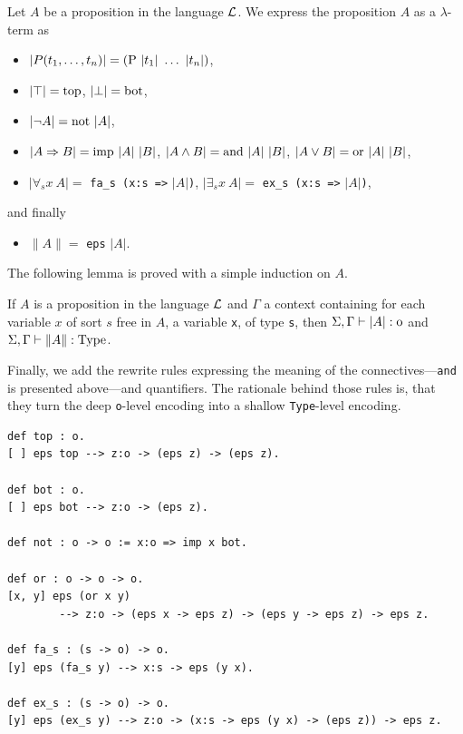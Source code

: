 \documentclass[english]{lipics}
\newcommand\fa{\forall}
\newcommand\ex{\exists}
\newcommand\lst[1]{{\rm \lstinline{#1}}}
\begin{document}
\begin{definition}
Let $A$ be a proposition in the language ${\cal L}$.
We express the proposition $A$ as a $\lambda$-term as
\begin{itemize}
\item $|P(t_1,\ldots,t_n)| = (\mbox{\lst{P}}~|t_1|~\ldots~|t_n|)$,
\item $|\top| = \mbox{\lst{top}}$, $|\bot| = \mbox{\lst{bot}}$,
\item $|\neg A| = \mbox{\lst{not}}~|A|$,
\item $|A \Rightarrow B| = \mbox{\lst{imp}}~|A|~|B|$,
$|A \wedge B| = \mbox{\lst{and}}~|A|~|B|$,
$|A \vee B| = \mbox{\lst{or}}~|A|~|B|$,
\item
$|\fa_s x~A| = $ \lst{fa_s (x:s =>} $|A|$\lst{)},
$|\ex_s x~A| = $ \lst{ex_s (x:s =>} $|A|$\lst{)},
\end{itemize}
and finally
\begin{itemize}
\item $\|A\| = $ \lst{eps} $|A|$.
\end{itemize}
\end{definition}

The following lemma is proved with a simple induction on $A$.
\begin{lemma}
If $A$ is a proposition in the language ${\cal L}$ and
$\Gamma$ a context containing for each variable $x$ of sort
$s$ free in $A$, a variable \lst{x}, of type \lst{s}, then
$\Sigma, \Gamma \vdash |A|:\mbox{\lst{o}}$
and
$\Sigma, \Gamma \vdash \|A\|:\mbox{\lst{Type}}$.
\end{lemma}

Finally, we add the rewrite rules expressing the meaning of the
connectives---\lst{and} is presented above---and quantifiers. The
rationale behind those rules is, that they turn the deep
\lst{o}-level encoding into a shallow \lst{Type}-level encoding.


\begin{lstlisting}
def top : o.
[ ] eps top --> z:o -> (eps z) -> (eps z).

def bot : o.
[ ] eps bot --> z:o -> (eps z).

def not : o -> o := x:o => imp x bot.

def or : o -> o -> o.
[x, y] eps (or x y)
        --> z:o -> (eps x -> eps z) -> (eps y -> eps z) -> eps z.

def fa_s : (s -> o) -> o.
[y] eps (fa_s y) --> x:s -> eps (y x).

def ex_s : (s -> o) -> o.
[y] eps (ex_s y) --> z:o -> (x:s -> eps (y x) -> (eps z)) -> eps z.
\end{lstlisting}
\end{document}
